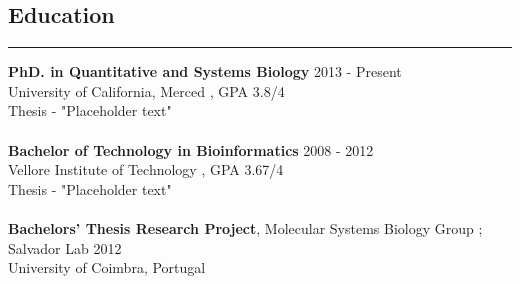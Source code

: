 \documentclass[line,margin]{cv_type2}
\begin{document}
\address{  your@email.com \\ (123) 456-7890 }
\address{  your_email \\ (123) 456-7890 }
\address{ \href {http://rgupta.in} {www.rgupta.in} \\  \href {http://github.com/rg-code} {github.com/rg-code}}

\begin{resume}

\section{Education}\hskip 4pt {\hfill \color{gray} \rule{14.7 cm}{0.1 pt}}
\begin{itemize}
                    {\textbf{PhD. in Quantitative and Systems Biology}} {\color{gray} \hfill 2013 - Present}\\
                    {University of California, Merced} {, GPA 3.8/4}\\
                    {\small{ Thesis} - "Placeholder text"}
                    \\
                    \\
                    {\textbf{Bachelor of Technology in Bioinformatics }} {\color{gray} \hfill 2008 - 2012}\\
                    Vellore Institute of Technology , GPA 3.67/4 \\
                    {\small{ Thesis} - "Placeholder text"}
                    \\
                    \\
                    {\textbf{Bachelors' Thesis Research Project}}, { Molecular Systems Biology Group ; Salvador Lab}{\color{gray} \hfill 2012} \\
                    University of Coimbra, Portugal
		            
\end{itemize}
		            \vskip 12pt
		            

\end{resume}
\end{document}

